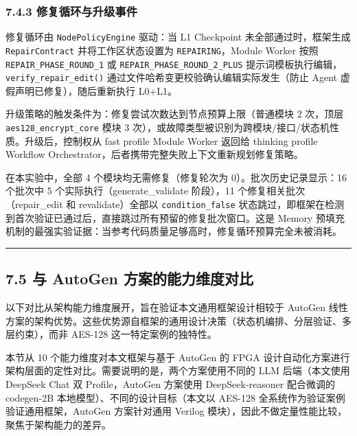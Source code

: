\subsubsection{7.4.3
修复循环与升级事件}\label{ux4feeux590dux5faaux73afux4e0eux5347ux7ea7ux4e8bux4ef6}

修复循环由 \texttt{NodePolicyEngine} 驱动：当 L1 Checkpoint
未全部通过时，框架生成 \texttt{RepairContract} 并将工作区状态设置为
\texttt{REPAIRING}，Module Worker 按照 \texttt{REPAIR\_PHASE\_ROUND\_1}
或 \texttt{REPAIR\_PHASE\_ROUND\_2\_PLUS}
提示词模板执行编辑，\texttt{verify\_repair\_edit()}
通过文件哈希变更校验确认编辑实际发生（防止 Agent
虚假声明已修复），随后重新执行 L0+L1。

升级策略的触发条件为：修复尝试次数达到节点预算上限（普通模块 2 次，顶层
\texttt{aes128\_encrypt\_core} 模块 3
次），或故障类型被识别为跨模块/接口/状态机性质。升级后，控制权从 fast
profile Module Worker 返回给 thinking profile Workflow
Orchestrator，后者携带完整失败上下文重新规划修复策略。

在本实验中，全部 4 个模块均无需修复（修复轮次为
0）。批次历史记录显示：16 个批次中 5 个实际执行（generate\_validate
阶段），11 个修复相关批次（repair\_edit 和 revalidate）全部以
\texttt{condition\_false}
状态跳过，即框架在检测到首次验证已通过后，直接跳过所有预留的修复批次窗口。这是
Memory
预填充机制的最强实验证据：当参考代码质量足够高时，修复循环预算完全未被消耗。

\begin{center}\rule{0.5\linewidth}{0.5pt}\end{center}

\subsection{7.5 与 AutoGen
方案的能力维度对比}\label{ux4e0e-autogen-ux65b9ux6848ux7684ux80fdux529bux7ef4ux5ea6ux5bf9ux6bd4}

以下对比从架构能力维度展开，旨在验证本文通用框架设计相较于 AutoGen
线性方案的架构优势。这些优势源自框架的通用设计决策（状态机编排、分层验证、多层约束），而非
AES-128 这一特定案例的独特性。

本节从 10 个能力维度对本文框架与基于 AutoGen 的 FPGA
设计自动化方案进行架构层面的定性对比。需要说明的是，两个方案使用不同的
LLM 后端（本文使用 DeepSeek Chat 双 Profile，AutoGen 方案使用
DeepSeek-reasoner 配合微调的 codegen-2B
本地模型）、不同的设计目标（本文以 AES-128
全系统作为验证案例验证通用框架，AutoGen 方案针对通用 Verilog
模块），因此不做定量性能比较，聚焦于架构能力的差异。

